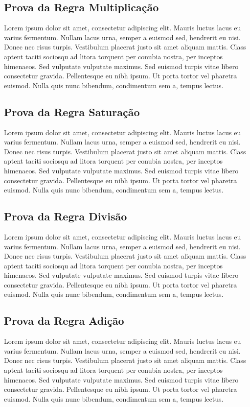 \documentclass[conference]{IEEEtran}
\begin{document}
\subsection{Prova da Regra Multiplicação}
Lorem ipsum dolor sit amet, consectetur adipiscing elit. Mauris luctus lacus eu varius fermentum. Nullam lacus urna, semper a euismod sed, hendrerit eu nisi. Donec nec risus turpis. Vestibulum placerat justo sit amet aliquam mattis. Class aptent taciti sociosqu ad litora torquent per conubia nostra, per inceptos himenaeos. Sed vulputate vulputate maximus. Sed euismod turpis vitae libero consectetur gravida. Pellentesque eu nibh ipsum. Ut porta tortor vel pharetra euismod. Nulla quis nunc bibendum, condimentum sem a, tempus lectus.

\subsection{Prova da Regra Saturação}
Lorem ipsum dolor sit amet, consectetur adipiscing elit. Mauris luctus lacus eu varius fermentum. Nullam lacus urna, semper a euismod sed, hendrerit eu nisi. Donec nec risus turpis. Vestibulum placerat justo sit amet aliquam mattis. Class aptent taciti sociosqu ad litora torquent per conubia nostra, per inceptos himenaeos. Sed vulputate vulputate maximus. Sed euismod turpis vitae libero consectetur gravida. Pellentesque eu nibh ipsum. Ut porta tortor vel pharetra euismod. Nulla quis nunc bibendum, condimentum sem a, tempus lectus.

\subsection{Prova da Regra Divisão}
Lorem ipsum dolor sit amet, consectetur adipiscing elit. Mauris luctus lacus eu varius fermentum. Nullam lacus urna, semper a euismod sed, hendrerit eu nisi. Donec nec risus turpis. Vestibulum placerat justo sit amet aliquam mattis. Class aptent taciti sociosqu ad litora torquent per conubia nostra, per inceptos himenaeos. Sed vulputate vulputate maximus. Sed euismod turpis vitae libero consectetur gravida. Pellentesque eu nibh ipsum. Ut porta tortor vel pharetra euismod. Nulla quis nunc bibendum, condimentum sem a, tempus lectus.

\subsection{Prova da Regra Adição}
Lorem ipsum dolor sit amet, consectetur adipiscing elit. Mauris luctus lacus eu varius fermentum. Nullam lacus urna, semper a euismod sed, hendrerit eu nisi. Donec nec risus turpis. Vestibulum placerat justo sit amet aliquam mattis. Class aptent taciti sociosqu ad litora torquent per conubia nostra, per inceptos himenaeos. Sed vulputate vulputate maximus. Sed euismod turpis vitae libero consectetur gravida. Pellentesque eu nibh ipsum. Ut porta tortor vel pharetra euismod. Nulla quis nunc bibendum, condimentum sem a, tempus lectus.
\end{document}
